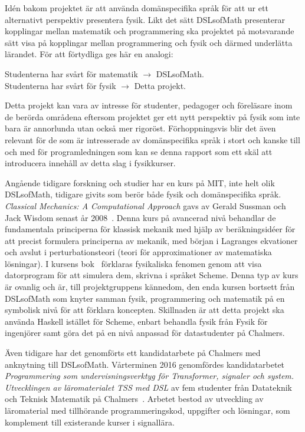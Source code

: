 Idén bakom projektet är att använda domänspecifika språk för att ur ett alternativt perspektiv presentera fysik. Likt det sätt DSLsofMath
presenterar kopplingar mellan matematik och programmering ska projektet på motsvarande sätt visa på kopplingar mellan programmering och fysik och därmed
underlätta lärandet. För att förtydliga ges här en analogi:


\begin{center}
Studenterna har svårt för matematik $\rightarrow $ DSLsofMath.\\
Studenterna har svårt för fysik $\rightarrow $ Detta projekt.
\end{center}

Detta projekt kan vara av intresse för studenter, pedagoger och
föreläsare inom de berörda områdena eftersom projektet ger ett nytt
perspektiv på fysik som inte bara är annorlunda utan också mer rigoröst.
Förhoppningsvis blir det även relevant för de som är intresserade av
domänspecifika språk i stort och kanske till och med för programledningen som
kan se denna rapport som ett skäl att introducera innehåll av detta slag i
fysikkurser.

Angående tidigare forskning och studier har en kurs på MIT, inte helt olik
DSLsofMath, tidigare givits som berör både fysik och
domänspecifika språk.
\textit{Classical Mechanics: A Computational Approach} gavs av Gerald Sussman
och Jack Wisdom senast år 2008~\cite{classical-mechanics-course-mit-2008}.
Denna kurs på avancerad nivå behandlar de fundamentala principerna för klassisk
mekanik med hjälp av beräkningsidéer för att precist formulera principerna av
mekanik, med början i Lagranges ekvationer och avslut i perturbationsteori
(teori för approximationer av matematiska lösningar). I kursens bok~\cite{SICM}
förklaras fysikaliska fenomen genom att visa datorprogram för att simulera dem,
skrivna i språket Scheme. Denna typ av kurs är ovanlig och är, till
projektgruppens kännedom, den enda kursen bortsett från DSLsofMath som knyter
samman fysik, programmering och matematik på en symbolisk nivå för att förklara
koncepten. Skillnaden är att detta projekt ska använda Haskell istället för Scheme, enbart behandla fysik från Fysik för ingenjörer samt göra det på en nivå anpassad för datastudenter på Chalmers.

Även tidigare har det genomförts ett kandidatarbete på Chalmers med anknytning till DSLsofMath.
Vårterminen 2016 genomfördes kandidatarbetet \textit{Programmering som
undervisningsverktyg för Transformer, signaler och system. Utvecklingen av
läromaterialet TSS med DSL} av fem studenter från Datateknik och Teknisk
Matematik på Chalmers~\cite{kandidat2016}. Arbetet bestod av utveckling av läromaterial med
tillhörande programmeringskod, uppgifter och lösningar, som komplement till
existerande kurser i signallära.

